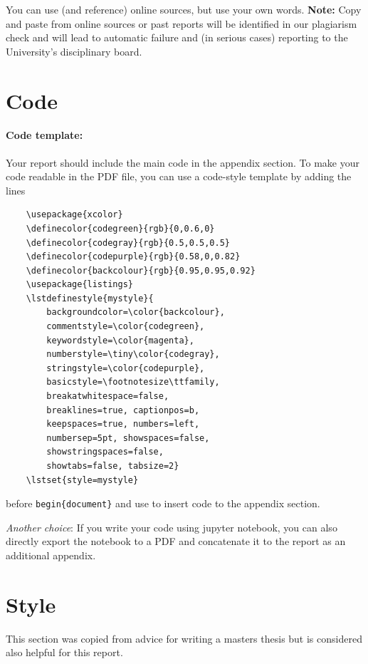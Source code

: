 \documentclass[11pt]{article}
\begin{document}
You can use (and reference) online sources, but use your own words.
\textbf{Note:} Copy and paste from online sources or past reports will be identified in our plagiarism check and will lead to automatic failure and (in serious cases) reporting to the University's disciplinary board.

\appendix

\section{Code}

\paragraph{Code template:}
Your report should include the main code in the appendix section. To make your code readable in the PDF file, you can use a code-style template by adding the lines 
\begin{verbatim}
    \usepackage{xcolor}
    \definecolor{codegreen}{rgb}{0,0.6,0}
    \definecolor{codegray}{rgb}{0.5,0.5,0.5}
    \definecolor{codepurple}{rgb}{0.58,0,0.82}
    \definecolor{backcolour}{rgb}{0.95,0.95,0.92} 
    \usepackage{listings}
    \lstdefinestyle{mystyle}{
        backgroundcolor=\color{backcolour},   
        commentstyle=\color{codegreen},
        keywordstyle=\color{magenta},
        numberstyle=\tiny\color{codegray},
        stringstyle=\color{codepurple},
        basicstyle=\footnotesize\ttfamily,
        breakatwhitespace=false,    
        breaklines=true, captionpos=b,    
        keepspaces=true, numbers=left,   
        numbersep=5pt, showspaces=false, 
        showstringspaces=false,
        showtabs=false, tabsize=2}
    \lstset{style=mystyle}
\end{verbatim}
before \verb|begin{document}| and use \verb|| to insert code to the appendix section.

\textit{Another choice}: If you write your code using jupyter notebook, you can also directly export the notebook to a PDF and concatenate it to the report as an additional appendix. %


\section{Style}
This section was copied from advice for writing a masters thesis but is considered also helpful for this report.
\end{document}
